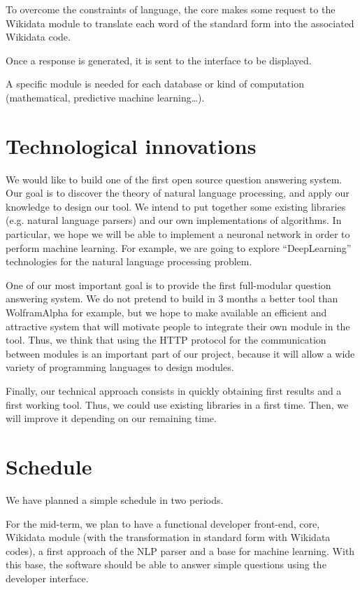 \documentclass[a4paper,10pt]{article}
\begin{document}
To overcome the constraints of language, the core makes some request to the Wikidata
 module to translate each word of the standard form into the associated Wikidata 
 code.

Once a response is generated, it is sent to the interface to be displayed.

A specific module is needed for each database or kind of computation (mathematical, 
predictive machine learning\ldots).

\section{Technological innovations}

We would like to build one of the first open source question answering system. 
Our goal is to discover the theory of natural language processing, and apply our 
knowledge to design our tool. We intend to put together some existing libraries 
(e.g. natural language parsers) and our own implementations of algorithms. In 
particular, we hope we will be able to implement a neuronal network in order to 
perform machine learning. For example, we are going to explore ``DeepLearning'' 
technologies for the natural language processing problem.

One of our most important goal is to provide the first full-modular question 
answering system. We do not pretend to build in 3 months a better tool than 
WolframAlpha for example, but we hope to make available an efficient and 
attractive system that will motivate people to integrate their own module in the 
tool. Thus, we think that using the HTTP protocol for the communication between 
modules is an important part of our project, because it will allow a wide variety 
of programming languages to design modules.

Finally, our technical approach consists in quickly obtaining first results and 
a first working tool. Thus, we could use existing libraries in a first time. Then, 
we will improve it depending on our remaining time.

\section{Schedule}

We have planned a simple schedule in two periods.

For the mid-term, we plan to have a functional developer front-end, core, 
Wikidata module (with the transformation in standard form with Wikidata codes), 
a first approach of the NLP parser and a base for machine learning. With this 
base, the software should be able to answer simple questions using the developer 
interface.
\end{document}

